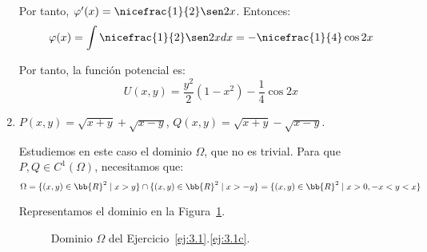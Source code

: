 \begin{ejercicio}
\begin{enumerate}
        Por tanto, $\varphi'(x)=\nicefrac{1}{2}\sen 2x$. Entonces:
        \begin{equation*}
            \varphi(x)=\int \nicefrac{1}{2}\sen 2xdx=-\nicefrac{1}{4}\cos 2x
        \end{equation*}

        Por tanto, la función potencial es:
        \begin{equation*}
            U(x,y)=\frac{y^2}{2}(1-x^2)-\frac{1}{4}\cos 2x
        \end{equation*}

        \item \label{ej:3.1c} $P(x, y) = \sqrt{x+y}+\sqrt{x-y}$, $Q(x, y) = \sqrt{x+y}-\sqrt{x-y}$.
        
        Estudiemos en este caso el dominio $\Omega$, que no es trivial. Para que $P,Q\in C^1(\Omega)$, necesitamos que:
        \begin{equation*}
            \Omega=\{(x,y)\in\bb{R}^2 \mid x> y\}\cap\{(x,y)\in\bb{R}^2 \mid x> -y\}
            = \{(x,y)\in\bb{R}^2 \mid x>0, -x< y< x\}
        \end{equation*}

        Representamos el dominio en la Figura~\ref{fig:3.1c}.
        \begin{figure}[h]
            \centering
            \caption{Dominio $\Omega$ del Ejercicio~\ref{ej:3.1}.\ref{ej:3.1c}.}
            \label{fig:3.1c}
        \end{figure}


\end{enumerate}
\end{ejercicio}
